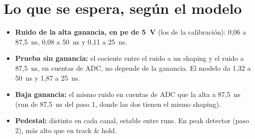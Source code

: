 \documentclass[11pt,a4paper]{article}
\begin{document}
\section{Lo que se espera, según el modelo}

\begin{itemize}
\item {\bf Ruido de la alta ganancia, en pe de 5~V} (los de la calibración):
  0,06 a 87,5~ns, 0,08 a 50~ns y 0,11 a 25~ns.
\item {\bf Prueba sin ganancia:} el cociente entre el ruido a un shaping y
  el ruido a 87,5~ns, en cuentas de ADC, no depende de la ganancia. El
  modelo da 1,32 a 50~ns y 1,87 a 25~ns.
\item {\bf Baja ganancia:} el mismo ruido en cuentas de ADC que la alta a
  87,5~ns (run de 87,5~ns del paso 1, donde las dos tienen el mismo
  shaping).
\item {\bf Pedestal:} distinto en cada canal, estable entre runs. En peak
  detector (paso 2), más alto que en track \& hold.
\end{itemize}
\end{document}
